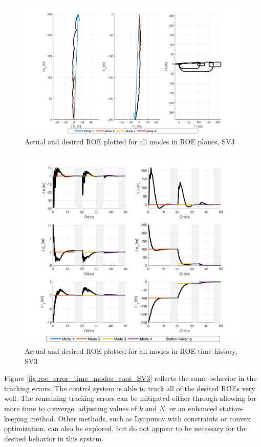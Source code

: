 \begin{figure}[H]
    \centering
    \includegraphics[width=0.75\linewidth]{sim/figures/PS6/ROE_planes_modes_SV3.png}
    \caption{Actual and desired ROE plotted for all modes in ROE planes, SV3}
    \label{fig:roe_planes_modes_cont_SV3}
\end{figure}
\begin{figure}[H]
    \centering
    \includegraphics[width=0.75\linewidth]{sim/figures/PS6/ROE_over_time_modes_SV3.png}
    \caption{Actual and desired ROE plotted for all modes in ROE time history, SV3}
    \label{fig:roe_time_modes_cont_SV3}
\end{figure}

Figure \ref{fig:roe_error_time_modes_cont_SV3} reflects the same behavior in the tracking errors. The control system is able to track all of the desired ROEs very well. The remaining tracking errors can be mitigated either through allowing for more time to converge, adjusting values of $k$ and $N$, or an enhanced station-keeping method. Other methods, such as Lyapunov with constraints or convex optimization, can also be explored, but do not appear to be necessary for the desired behavior in this system. 

